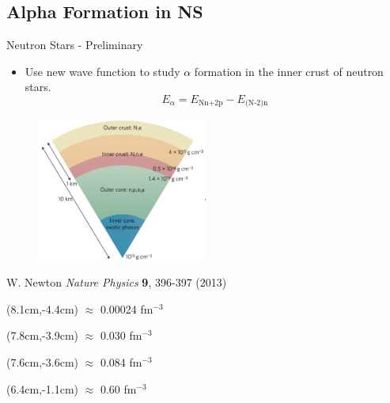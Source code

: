 \documentclass{beamer}
\begin{document}
\subsection{Alpha Formation in NS}
\begin{frame}{Neutron Stars - Preliminary}
\begin{itemize}
   \item Use new wave function to study $\alpha$ formation in the inner crust of neutron stars.
   \begin{equation*}
      E_\alpha = E_\text{Nn+2p} - E_\text{(N-2)n}
   \end{equation*}
\end{itemize}
\vspace{-0.5cm}
\begin{figure}[h]
   \centering
   \includegraphics[width=0.5\textwidth]{../figures/neutronstar.png}
\end{figure}
{\tiny W. Newton {\it Nature Physics} {\bf 9}, 396-397 (2013)}
\begin{textblock*}{\textwidth}(8.1cm,-4.4cm) %
   \tiny $\approx$ 0.00024 fm$^{-3}$
\end{textblock*}
\begin{textblock*}{\textwidth}(7.8cm,-3.9cm) %
   \tiny $\approx$ 0.030 fm$^{-3}$
\end{textblock*}
\begin{textblock*}{\textwidth}(7.6cm,-3.6cm) %
   \tiny $\approx$ 0.084 fm$^{-3}$
\end{textblock*}
\begin{textblock*}{\textwidth}(6.4cm,-1.1cm) %
   \tiny $\approx$ 0.60 fm$^{-3}$
\end{textblock*}
\end{frame}
\end{document}
